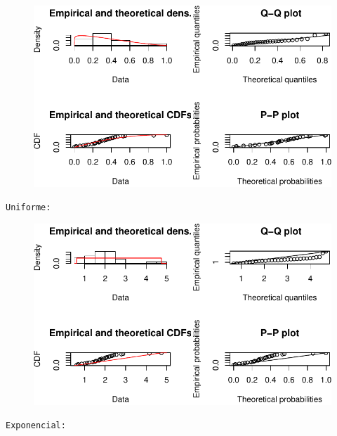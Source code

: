 \documentclass[
  letterpaper,
  DIV=11,
  numbers=noendperiod]{scrartcl}
\begin{document}
\begin{figure}[H]

{\centering \includegraphics{quiz5_files/figure-pdf/unnamed-chunk-33-6.pdf}

}

\end{figure}

\begin{verbatim}
Uniforme: 
\end{verbatim}

\begin{figure}[H]

{\centering \includegraphics{quiz5_files/figure-pdf/unnamed-chunk-33-7.pdf}

}

\end{figure}

\begin{verbatim}
Exponencial: 
\end{verbatim}
\end{document}
